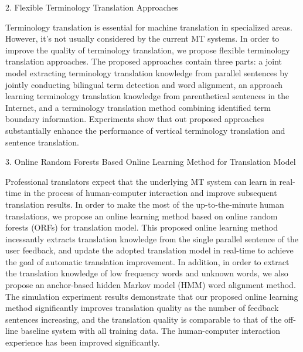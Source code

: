 2. Flexible Terminology Translation Approaches

Terminology translation is essential for machine translation in specialized areas. However, it’s not usually considered by the current MT systems. In order to improve the quality of terminology translation, we propose flexible terminology translation approaches. The proposed approaches contain three parts: a joint model extracting terminology translation knowledge from parallel sentences by jointly conducting bilingual term detection and word alignment, an approach learning terminology translation knowledge from parenthetical sentences in the Internet, and a terminology translation method combining identified term boundary information. Experiments show that out proposed approaches substantially enhance the performance of vertical terminology translation and sentence translation.

3. Online Random Forests Based Online Learning Method for Translation Model

Professional translators expect that the underlying MT system can learn in real-time in the process of human-computer interaction and improve subsequent translation results. In order to make the most of the up-to-the-minute human translations, we propose an online learning method based on online random forests (ORFs) for translation model. This proposed online learning method incessantly extracts translation knowledge from the single parallel sentence of the user feedback, and update the adopted translation model in real-time to achieve the goal of automatic translation improvement. In addition, in order to extract the translation knowledge of low frequency words and unknown words, we also propose an anchor-based hidden Markov model (HMM) word alignment method. The simulation experiment results demonstrate that our proposed online learning method significantly improves translation quality as the number of feedback sentences increasing, and the translation quality is comparable to that of the off-line baseline system with all training data. The human-computer interaction experience has been improved significantly.



